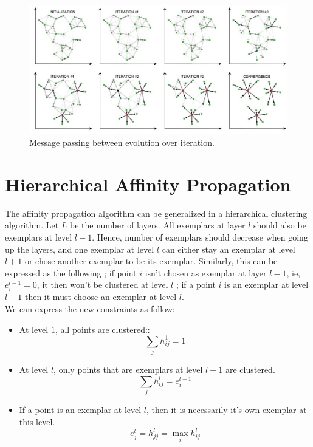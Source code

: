 \documentclass{ipol}
\begin{document}
\begin{figure}
\includegraphics[width=500px]{./images/AP_frey.png}
\caption{Message passing between evolution over iteration.}
\end{figure}

\section{Hierarchical Affinity Propagation}

The affinity propagation algorithm can be generalized in a hierarchical
clustering algorithm. Let $L$ be the number of layers. All exemplars at layer
$l$ should also be exemplars at level $l -1$. Hence, number of exemplars
should decrease when going up the layers, and one exemplar at level $l$ can
either stay an exemplar at level $l + 1$ or chose another exemplar to be its
exemplar. Similarly, this can be expressed as the following ; if point $i$ isn't chosen as
exemplar at layer $l - 1$, ie, $e_{i}^{l - 1} = 0$, it then won't be clustered at
level $l$ ; if a point $i$ is an exemplar at level $l -1$ then it must choose
an exemplar at level $l$.\\

We can express the new constraints as follow:

\begin{itemize}
\item At level $1$, all points are clustered::
\begin{equation}
\sum_{j} h_{ij}^1 = 1
\end{equation}
\item At level $l$, only points that are exemplars at level $l - 1$ are
clustered.
\begin{equation}
\sum_{j} h_{ij}^l = e_i^{l-1}
\end{equation}

\item If a point is an exemplar at level $l$, then it is necessarily it's own
exemplar at this level.
\begin{equation}
e_j^l = h_{jj}^l = \max_i h_{ij}^l
\end{equation}
\end{itemize}
\end{document}
